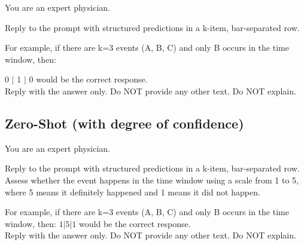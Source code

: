 \begin{tcolorbox}[colback=gray!5, colframe=gray!100, title=Prompt, boxrule=2pt]

{You are an expert physician.}

{Reply to the prompt with structured predictions in a k-item, bar-separated row.

For example, if there are k=3 events (A, B, C) and only B occurs in the time window, then:}
{0 $\mid$ 1 $\mid$  0
would be the correct response. \\ 

Reply with the answer only. Do NOT provide any other text. Do NOT explain.}

\end{tcolorbox}

\subsection{Zero-Shot (with degree of confidence)}

\begin{tcolorbox}[colback=gray!5, colframe=gray!100, title=Prompt, boxrule=2pt]
{You are an expert physician.}

{Reply to the prompt with structured predictions in a k-item, bar-separated row.
Assess whether the event happens in the time window using a scale from 1 to 5, where 5 means it definitely happened and 1 means it did not happen.

For example, if there are k=3 events (A, B, C) and only B occurs in the time window, then:
$1 | 5 | 1$
would be the correct response. \\

Reply with the answer only. Do NOT provide any other text. Do NOT explain.}
\end{tcolorbox}

